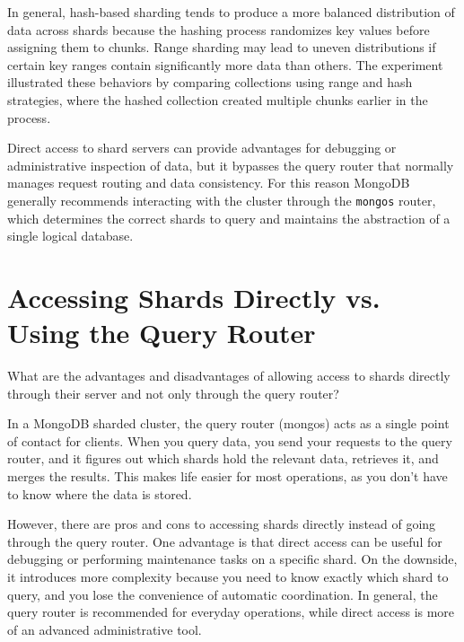 \documentclass[11pt]{article}
\begin{document}
\begin{tcolorbox}

In general, hash-based sharding tends to produce a more balanced distribution of data across shards because the hashing process randomizes key values before assigning them to chunks. Range sharding may lead to uneven distributions if certain key ranges contain significantly more data than others. The experiment illustrated these behaviors by comparing collections using range and hash strategies, where the hashed collection created multiple chunks earlier in the process.

Direct access to shard servers can provide advantages for debugging or administrative inspection of data, but it bypasses the query router that normally manages request routing and data consistency. For this reason MongoDB generally recommends interacting with the cluster through the \texttt{mongos} router, which determines the correct shards to query and maintains the abstraction of a single logical database.

\end{tcolorbox}

\section*{Accessing Shards Directly vs. Using the Query Router}

What are the advantages and disadvantages of allowing access to shards directly through 
their server and not only through the query router?  

\begin{tcolorbox}

In a MongoDB sharded cluster, the query router (mongos) acts as a single point of contact for clients. When you query data, you send your requests to the query router, and it figures out which shards hold the relevant data, retrieves it, and merges the results. This makes life easier for most operations, as you don’t have to know where the data is stored.

However, there are pros and cons to accessing shards directly instead of going through the query router. One advantage is that direct access can be useful for debugging or performing maintenance tasks on a specific shard. On the downside, it introduces more complexity because you need to know exactly which shard to query, and you lose the convenience of automatic coordination. In general, the query router is recommended for everyday operations, while direct access is more of an advanced administrative tool.

\end{tcolorbox}
\end{document}
